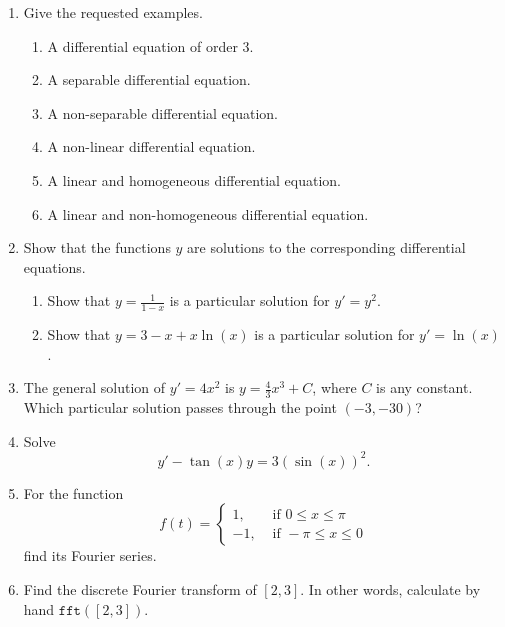 \documentclass[12pt]{article}
\newcommand{\ratkaisu}[1]{{\color{blue}\quad\textrm{Solution } #1}}
\renewcommand{\ratkaisu}[1]{}
\begin{document}
\begin{enumerate}
\item Give the requested examples.
\begin{enumerate}
\item A differential equation of order 3.
\item A separable differential equation.
\item A non-separable differential equation.
\item A non-linear differential equation.
\item A linear and homogeneous differential equation.
\item A linear and non-homogeneous differential equation.
\end{enumerate}
\item Show that the functions $y$ are solutions to the corresponding differential equations.
\begin{enumerate}
\item Show that $y=\frac{1}{1-x}$ is a particular solution for $y'=y^2$.
\item Show that $y=3-x+x\ln(x)$ is a particular solution for $y'=\ln(x)$.
\end{enumerate}
\ratkaisu{The derivative is
$$
y'=\frac{d}{dx}(1-x)^{-1}=-1\cdot (1-x)^{-1-1}\frac{d}{dx}(1-x)=-1\cdot (1-x)^{-2}\cdot(-1)=\frac{1}{(1-x)^2}=y^2
$$}

\item The general solution of $y'=4x^2$ is $y=\frac{4}{3}x^3+C$, where $C$ is any constant. Which particular solution passes through the point $(-3,-30)$?
\ratkaisu{We have $y(x)=y=\frac{4}{3}x^3+C.$ Set $x=-3$ and $y(-3)=-30$ to obtain
$$
-30=\frac{4}{3}(-3)^3+C,
$$
that is
$$
-30=-36+C.
$$
We have $C=6$. The desired solution is $y(x)=y=\frac{4}{3}x^3+6$.
}
\item Solve
$$
y'-\tan(x)y=3(\sin(x))^2.
$$
\item For the function
$$
f(t)
=\begin{cases}
1,&\textrm{ if }0\leq x\leq \pi\\
-1,&\textrm{ if }-\pi\leq x\leq 0
\end{cases}
$$
find its Fourier series.

\item Find the discrete Fourier transform of $[2,3]$. In other words, calculate by hand $\texttt{fft}([2,3])$.
\ratkaisu{$\texttt{fft}([2,3])=[5,-1]$}
\end{enumerate}
\end{document}
